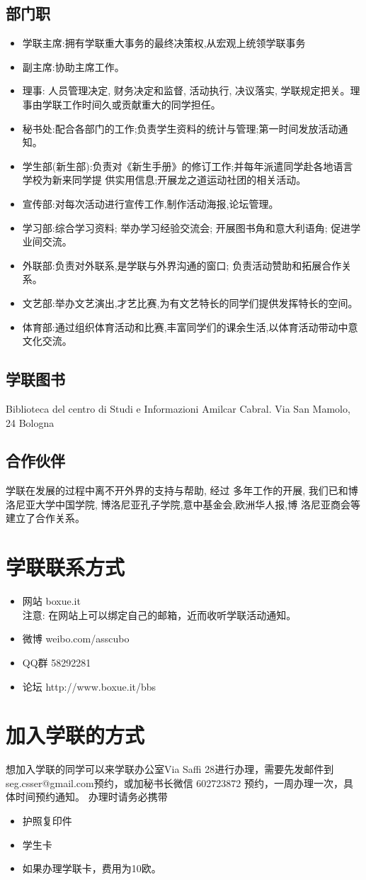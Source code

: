 \subsection{部门职}
\begin{itemize}
\item 学联主席:拥有学联重大事务的最终决策权,从宏观上统领学联事务
\item 副主席:协助主席工作。 
\item 理事: 人员管理决定, 财务决定和监督, 活动执行, 决议落实, 学联规定把关。理事由学联工作时间久或贡献重大的同学担任。
\item 秘书处:配合各部门的工作;负责学生资料的统计与管理;第一时间发放活动通知。
\item 学生部(新生部):负责对《新生手册》的修订工作;并每年派遣同学赴各地语言学校为新来同学提 供实用信息;开展龙之道运动社团的相关活动。
\item 宣传部:对每次活动进行宣传工作,制作活动海报,论坛管理。
\item 学习部:综合学习资料; 举办学习经验交流会; 开展图书角和意大利语角; 促进学业间交流。
\item 外联部:负责对外联系,是学联与外界沟通的窗口; 负责活动赞助和拓展合作关系。
\item 文艺部:举办文艺演出,才艺比赛,为有文艺特长的同学们提供发挥特长的空间。
\item 体育部:通过组织体育活动和比赛,丰富同学们的课余生活,以体育活动带动中意文化交流。 
\end{itemize}

\subsection{学联图书}
Biblioteca del centro di Studi e Informazioni Amilcar Cabral. Via San Mamolo, 24 Bologna


\subsection{合作伙伴}
学联在发展的过程中离不开外界的支持与帮助, 经过 多年工作的开展, 我们已和博洛尼亚大学中国学院, 博洛尼亚孔子学院,意中基金会,欧洲华人报,博 洛尼亚商会等建立了合作关系。 

\section{学联联系方式}
\begin{itemize}
\item 网站 boxue.it \\
注意: 在网站上可以绑定自己的邮箱，近而收听学联活动通知。
\item 微博 weibo.com/asscubo
\item QQ群 58292281
\item 论坛 http://www.boxue.it/bbs
\end{itemize}

\section{加入学联的方式}
想加入学联的同学可以来学联办公室Via Saffi 28进行办理，需要先发邮件到seg.csser@gmail.com预约，或加秘书长微信 602723872 预约，一周办理一次，具体时间预约通知。
办理时请务必携带 
\begin{itemize}
\item 护照复印件
\item 学生卡
\item 如果办理学联卡，费用为10欧。
\end{itemize}